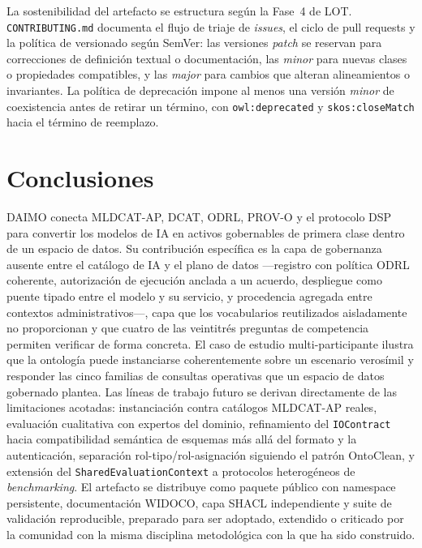 \documentclass[11pt,a4paper]{article}
\newcommand{\code}[1]{\texttt{#1}}
\begin{document}
La sostenibilidad del artefacto se estructura según la Fase~4 de LOT. \code{CONTRIBUTING.md} documenta el flujo de triaje de \emph{issues}, el ciclo de pull requests y la política de versionado según SemVer: las versiones \emph{patch} se reservan para correcciones de definición textual o documentación, las \emph{minor} para nuevas clases o propiedades compatibles, y las \emph{major} para cambios que alteran alineamientos o invariantes. La política de deprecación impone al menos una versión \emph{minor} de coexistencia antes de retirar un término, con \code{owl:deprecated} y \code{skos:closeMatch} hacia el término de reemplazo.

\section{Conclusiones}\label{sec:conclusion}

DAIMO conecta MLDCAT-AP, DCAT, ODRL, PROV-O y el protocolo DSP para convertir los modelos de IA en activos gobernables de primera clase dentro de un espacio de datos. Su contribución específica es la capa de gobernanza ausente entre el catálogo de IA y el plano de datos ---registro con política ODRL coherente, autorización de ejecución anclada a un acuerdo, despliegue como puente tipado entre el modelo y su servicio, y procedencia agregada entre contextos administrativos---, capa que los vocabularios reutilizados aisladamente no proporcionan y que cuatro de las veintitrés preguntas de competencia permiten verificar de forma concreta. El caso de estudio multi-participante ilustra que la ontología puede instanciarse coherentemente sobre un escenario verosímil y responder las cinco familias de consultas operativas que un espacio de datos gobernado plantea. Las líneas de trabajo futuro se derivan directamente de las limitaciones acotadas: instanciación contra catálogos MLDCAT-AP reales, evaluación cualitativa con expertos del dominio, refinamiento del \code{IOContract} hacia compatibilidad semántica de esquemas más allá del formato y la autenticación, separación rol-tipo/rol-asignación siguiendo el patrón OntoClean, y extensión del \code{SharedEvaluationContext} a protocolos heterogéneos de \emph{benchmarking}. El artefacto se distribuye como paquete público con namespace persistente, documentación WIDOCO, capa SHACL independiente y suite de validación reproducible, preparado para ser adoptado, extendido o criticado por la comunidad con la misma disciplina metodológica con la que ha sido construido.
\end{document}
